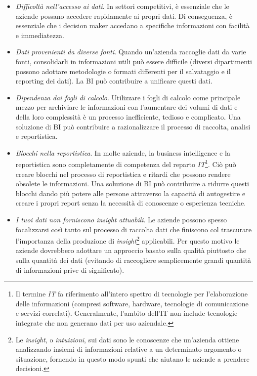 \begin{itemize}
    \item \textit{Difficoltà nell'accesso ai dati}. In settori competitivi, è essenziale che le aziende possano accedere rapidamente ai propri dati. Di conseguenza, è essenziale che i decision maker accedano a specifiche informazioni con facilità e immediatezza.
    \item \textit{Dati provenienti da diverse fonti}. Quando un'azienda raccoglie dati da varie fonti, consolidarli in informazioni utili può essere difficile (diversi dipartimenti possono adottare metodologie o formati differenti per il salvataggio e il reporting dei dati). La BI può contribuire a unificare questi dati.
    \item \textit{Dipendenza dai fogli di calcolo}. Utilizzare i fogli di calcolo come principale mezzo per archiviare le informazioni con l'aumentare dei volumi di dati e della loro complessità è un processo inefficiente, tedioso e complicato. Una soluzione di BI può contribuire a razionalizzare il processo di raccolta, analisi e reportistica.
    \item \textit{Blocchi nella reportistica}. In molte aziende, la business intelligence e la reportistica sono completamente di competenza del reparto \textit{IT}\footnote{Il termine \textit{IT} fa riferimento all'intero spettro di tecnologie per l'elaborazione delle informazioni (compresi software, hardware, tecnologie di comunicazione e servizi correlati). Generalmente, l'ambito dell'IT non include tecnologie integrate che non generano dati per uso aziendale.}. Ciò può creare blocchi nel processo di reportistica e ritardi che possono rendere obsolete le informazioni. Una soluzione di BI può contribuire a ridurre questi blocchi dando più potere alle persone attraverso la capacità di autogestire e creare i propri report senza la necessità di conoscenze o esperienza tecniche.
    \item \textit{I tuoi dati non forniscono insight attuabili}. Le aziende possono spesso focalizzarsi così tanto sul processo di raccolta dati che finiscono col trascurare l'importanza della produzione di \textit{insight}\footnote{Le \textit{insight}, o \textit{intuizioni}, sui dati sono le conoscenze che un'azienda ottiene analizzando insiemi di informazioni relative a un determinato argomento o situazione, fornendo in questo modo spunti che aiutano le aziende a prendere decisioni.} applicabili. Per questo motivo le aziende dovrebbero adottare un approccio basato sulla qualità piuttosto che sulla quantità dei dati (evitando di raccogliere semplicemente grandi quantità di informazioni prive di significato).

\end{itemize}
